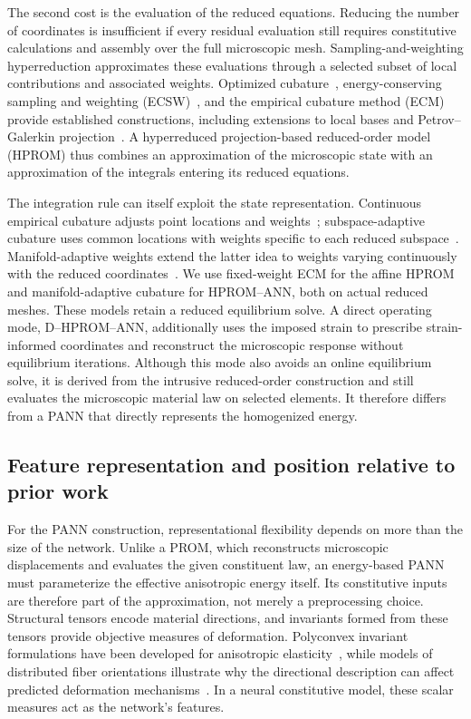 The second cost is the evaluation of the reduced equations. Reducing the number of coordinates is insufficient if every residual evaluation still requires constitutive calculations and assembly over the full microscopic mesh. Sampling-and-weighting hyperreduction approximates these evaluations through a selected subset of local contributions and associated weights. Optimized cubature~\cite{An2008}, energy-conserving sampling and weighting (ECSW)~\cite{Farhat2014,farhat2015}, and the empirical cubature method (ECM)~\cite{hernandez2017} provide established constructions, including extensions to local bases and Petrov--Galerkin projection~\cite{Grimberg2021,AresDeParga2023}. A hyperreduced projection-based reduced-order model (HPROM) thus combines an approximation of the microscopic state with an approximation of the integrals entering its reduced equations.

The integration rule can itself exploit the state representation. Continuous empirical cubature adjusts point locations and weights~\cite{Hernandez2024}; subspace-adaptive cubature uses common locations with weights specific to each reduced subspace~\cite{Bravo2024}. Manifold-adaptive weights extend the latter idea to weights varying continuously with the reduced coordinates~\cite{hernandez2026}. We use fixed-weight ECM for the affine HPROM and manifold-adaptive cubature for HPROM--ANN, both on actual reduced meshes. These models retain a reduced equilibrium solve. A direct operating mode, D--HPROM--ANN, additionally uses the imposed strain to prescribe strain-informed coordinates and reconstruct the microscopic response without equilibrium iterations. Although this mode also avoids an online equilibrium solve, it is derived from the intrusive reduced-order construction and still evaluates the microscopic material law on selected elements. It therefore differs from a PANN that directly represents the homogenized energy.

\subsection{Feature representation and position relative to prior work}
\label{sec:discussion}
For the PANN construction, representational flexibility depends on more than the size of the network. Unlike a PROM, which reconstructs microscopic displacements and evaluates the given constituent law, an energy-based PANN must parameterize the effective anisotropic energy itself. Its constitutive inputs are therefore part of the approximation, not merely a preprocessing choice. Structural tensors encode material directions, and invariants formed from these tensors provide objective measures of deformation. Polyconvex invariant formulations have been developed for anisotropic elasticity~\cite{SchroderNeff2003}, while models of distributed fiber orientations illustrate why the directional description can affect predicted deformation mechanisms~\cite{Gasser2006}. In a neural constitutive model, these scalar measures act as the network's features.

